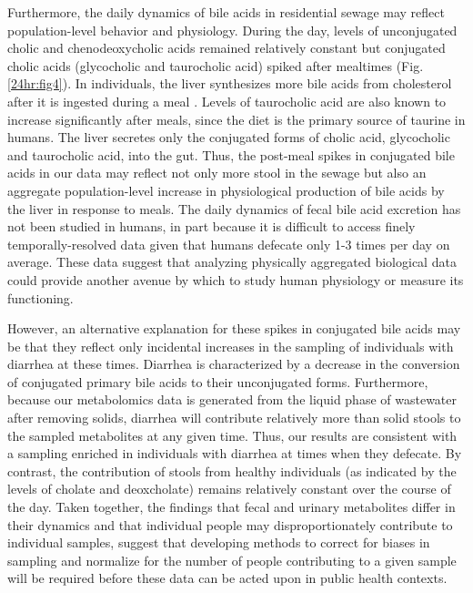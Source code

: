 Furthermore, the daily dynamics of bile acids in residential sewage may reflect population-level behavior and physiology. During the day, levels of unconjugated cholic and chenodeoxycholic acids remained relatively constant but conjugated cholic acids (glycocholic and taurocholic acid) spiked after mealtimes (Fig. \ref{24hr:fig4}). In individuals, the liver synthesizes more bile acids from cholesterol after it is ingested during a meal \cite{Hofmann1989}. Levels of taurocholic acid are also known to increase significantly after meals, since the diet is the primary source of taurine in humans. The liver secretes only the conjugated forms of cholic acid, glycocholic and taurocholic acid, into the gut. Thus, the post-meal spikes in conjugated bile acids in our data may reflect not only more stool in the sewage but also an aggregate population-level increase in physiological production of bile acids by the liver in response to meals. The daily dynamics of fecal bile acid excretion has not been studied in humans, in part because it is difficult to access finely temporally-resolved data given that humans defecate only 1-3 times per day on average. These data suggest that analyzing physically aggregated biological data could provide another avenue by which to study human physiology or measure its functioning.

However, an alternative explanation for these spikes in conjugated bile acids may be that they reflect only incidental increases in the sampling of individuals with diarrhea at these times. Diarrhea is characterized by a decrease in the conversion of conjugated primary bile acids to their unconjugated forms. Furthermore, because our metabolomics data is generated from the liquid phase of wastewater after removing solids, diarrhea will contribute relatively more than solid stools to the sampled metabolites at any given time. Thus, our results are consistent with a sampling enriched in individuals with diarrhea at times when they defecate. By contrast, the contribution of stools from healthy individuals (as indicated by the levels of cholate and deoxcholate) remains relatively constant over the course of the day. Taken together, the findings that fecal and urinary metabolites differ in their dynamics and that individual people may disproportionately contribute to individual samples, suggest that developing methods to correct for biases in sampling and normalize for the number of people contributing to a given sample will be required before these data can be acted upon in public health contexts.

